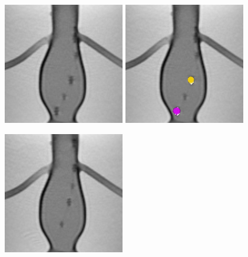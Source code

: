 \documentclass[conference]{IEEEtran}
\begin{document}
\begin{figure}[htbp]
    \centering
    \begin{minipage}[t]{0.49\textwidth}
        \centering
        \includegraphics[width=0.49\linewidth]{Conference/img/tracking-websocket-start.jpg}
        \vspace{0.1cm}
        \includegraphics[width=0.49\linewidth]{Conference/img/tracking-websocket-tracks-start.jpg}
    \end{minipage}
    \begin{minipage}[t]{0.49\textwidth}
        \centering
        \includegraphics[width=0.49\linewidth]{Conference/img/tracking-websocket-end.jpg}

\end{minipage}
\end{figure}
\end{document}
